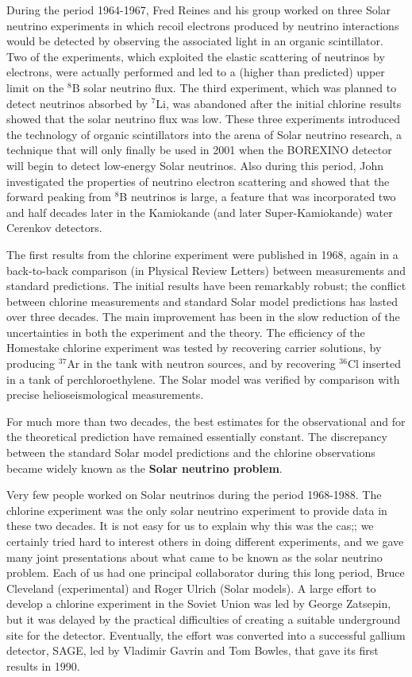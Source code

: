 \documentclass[a4paper,10pt]{article}
\begin{document}
{\noindent}During the period 1964-1967, Fred Reines and his group worked on three Solar neutrino experiments in which recoil electrons produced by neutrino interactions would be detected by observing the associated light in an organic scintillator. Two of the experiments, which exploited the elastic scattering of neutrinos by electrons, were actually performed and led to a (higher than predicted) upper limit on the $^8$B solar neutrino flux. The third experiment, which was planned to detect neutrinos absorbed by $^7$Li, was abandoned after the initial chlorine results showed that the solar neutrino flux was low. These three experiments introduced the technology of organic scintillators into the arena of Solar neutrino research, a technique that will only finally be used in 2001 when the BOREXINO detector will begin to detect low-energy Solar neutrinos. Also during this period, John investigated the properties of neutrino electron scattering and showed that the forward peaking from $^8$B neutrinos is large, a feature that was incorporated two and half decades later in the Kamiokande (and later Super-Kamiokande) water Cerenkov detectors.

{\noindent}The first results from the chlorine experiment were published in 1968, again in a back-to-back comparison (in Physical Review Letters) between measurements and standard predictions. The initial results have been remarkably robust; the conflict between chlorine measurements and standard Solar model predictions has lasted over three decades. The main improvement has been in the slow reduction of the uncertainties in both the experiment and the theory. The efficiency of the Homestake chlorine experiment was tested by recovering carrier solutions, by producing $^{37}$Ar in the tank with neutron sources, and by recovering $^{36}$Cl inserted in a tank of perchloroethylene. The Solar model was verified by comparison with precise helioseismological measurements.

{\noindent}For much more than two decades, the best estimates for the observational and for the theoretical prediction have remained essentially constant. The discrepancy between the standard Solar model predictions and the chlorine observations became widely known as the \textbf{Solar neutrino problem}. 

{\noindent}Very few people worked on Solar neutrinos during the period 1968-1988. The chlorine experiment was the only solar neutrino experiment to provide data in these two decades. It is not easy for us to explain why this was the cas;; we certainly tried hard to interest others in doing different experiments, and we gave many joint presentations about what came to be known as the solar neutrino problem. Each of us had one principal collaborator during this long period, Bruce Cleveland (experimental) and Roger Ulrich (Solar models). A large effort to develop a chlorine experiment in the Soviet Union was led by George Zatsepin, but it was delayed by the practical difficulties of creating a suitable underground site for the detector. Eventually, the effort was converted into a successful gallium detector, SAGE, led by Vladimir Gavrin and Tom Bowles, that gave its first results in 1990.
\end{document}

